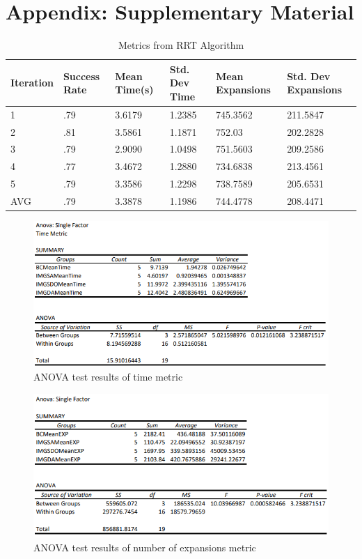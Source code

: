 \documentclass{article}
\begin{document}




\appendix
\section{Appendix: Supplementary Material}

\begin{table}[h]
  \caption{Metrics from RRT Algorithm}
  \label{RRT Metrics}
  \centering
  \begin{tabular}{llllll}
    \cmidrule(r){1-6}
   Iteration & Success Rate & Mean Time(s) & Std. Dev Time & Mean Expansions & Std. Dev Expansions\\
    \midrule
    1 & .79 & 3.6179 & 1.2385 & 745.3562 & 211.5847 \\
    2 & .81 & 3.5861 & 1.1871 & 752.03 & 202.2828 \\
    3 & .79 & 2.9090 & 1.0498 & 751.5603 & 209.2586 \\
    4 & .77 & 3.4672 & 1.2880 & 734.6838 & 213.4561 \\
    5 & .79 & 3.3586 & 1.2298 & 738.7589 & 205.6531 \\
 \midrule
  AVG & .79 & 3.3878 & 1.1986 & 744.4778 & 208.4471 \\
    \bottomrule
  \end{tabular}
\end{table}

\begin{figure}[h]
	\centerline{\includegraphics[scale=0.7]{TTG ANOVA.png}}
        \caption{ANOVA test results of time metric}
\end{figure}

\begin{figure}[h]
	\centerline{\includegraphics[scale=0.7]{ANOVAEXP.png}}
        \caption{ANOVA test results of number of expansions metric}
\end{figure}
\end{document}

